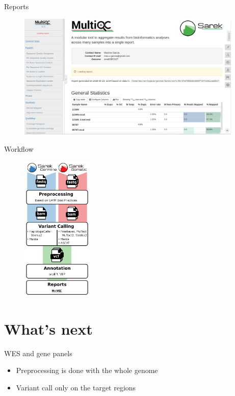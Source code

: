 \documentclass[usepdftitle=false]{beamer}
\begin{document}
\begin{frame}{Reports}
	\begin{figure}
		\includegraphics[height=6cm]{pictures/MultiQC_screenshot-2018-07-02.png}
	\end{figure}
\end{frame}

\begin{frame}{Workflow}
	\begin{figure}
		\includegraphics[height=7cm]{pictures/Sarek_workflow_2}
	\end{figure}
\end{frame}

\section{What's next}

\begin{frame}{WES and gene panels}
	\begin{itemize}
		\item Preprocessing is done with the whole genome
		\pause
		\item Variant call only on the target regions
	\end{itemize}
\end{frame}
\end{document}
